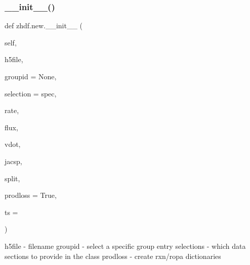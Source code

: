 \subsubsection{\texorpdfstring{\+\_\+\+\_\+init\+\_\+\+\_\+()}{\_\_init\_\_()}\hspace{0.1cm}{\footnotesize\ttfamily [1/2]}}
{\footnotesize\ttfamily def zhdf.\+new.\+\_\+\+\_\+init\+\_\+\+\_\+ (\begin{DoxyParamCaption}\item[{}]{self,  }\item[{}]{h5file,  }\item[{}]{groupid = {\ttfamily None},  }\item[{}]{selection = {\ttfamily \textquotesingle{}spec},  }\item[{}]{rate,  }\item[{}]{flux,  }\item[{}]{vdot,  }\item[{}]{jacsp,  }\item[{}]{split,  }\item[{}]{prodloss = {\ttfamily True},  }\item[{}]{ts = {} }\end{DoxyParamCaption})}

\begin{DoxyVerb}h5file     - filename
groupid    - select a specific group entry
selections - which data sections to provide in the class
prodloss   - create rxn/ropa dictionaries\end{DoxyVerb}
 

